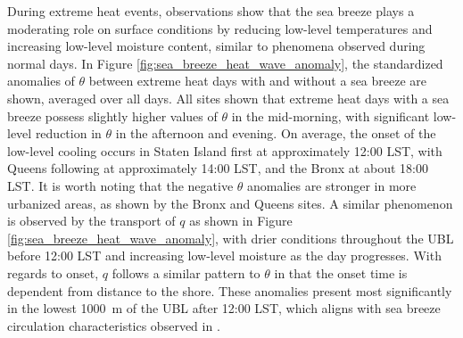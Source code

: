 \documentclass[11pt,a4paper]{article}
\begin{document}
During extreme heat events, observations show that the sea breeze plays a moderating role on surface conditions by reducing low-level temperatures and increasing low-level moisture content, similar to phenomena observed during normal days. In Figure \ref{fig:sea_breeze_heat_wave_anomaly}, the standardized anomalies of $\theta$ between extreme heat days with and without a sea breeze are shown, averaged over all days. All sites shown that extreme heat days with a sea breeze possess slightly higher values of $\theta$ in the mid-morning, with significant low-level reduction in $\theta$ in the afternoon and evening. On average, the onset of the low-level cooling occurs in Staten Island first at approximately 12:00 LST, with Queens following at approximately 14:00 LST, and the Bronx at about 18:00 LST. It is worth noting that the negative $\theta$ anomalies are stronger in more urbanized areas, as shown by the Bronx and Queens sites. A similar phenomenon is observed by the transport of $q$ as shown in Figure \ref{fig:sea_breeze_heat_wave_anomaly}, with drier conditions throughout the UBL before 12:00 LST and increasing low-level moisture as the day progresses. With regards to onset, $q$ follows a similar pattern to $\theta$ in that the onset time is dependent from distance to the shore. These anomalies present most significantly in the lowest \SI{1000}{\meter} of the UBL after 12:00 LST, which aligns with sea breeze circulation characteristics observed in \citet{frizzola1963}.
\end{document}
